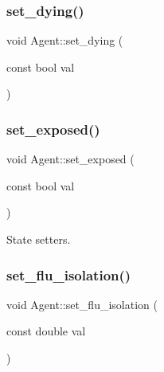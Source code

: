 \subsubsection{\texorpdfstring{set\+\_\+dying()}{set\_dying()}}
{\footnotesize\ttfamily void Agent\+::set\+\_\+dying (\begin{DoxyParamCaption}\item[{const bool}]{val }\end{DoxyParamCaption})\hspace{0.3cm}{\ttfamily [inline]}}

\mbox{\label{classAgent_a33c15434f6aa6e70eaf80044caa16376}} 
\subsubsection{\texorpdfstring{set\+\_\+exposed()}{set\_exposed()}}
{\footnotesize\ttfamily void Agent\+::set\+\_\+exposed (\begin{DoxyParamCaption}\item[{const bool}]{val }\end{DoxyParamCaption})\hspace{0.3cm}{\ttfamily [inline]}}



State setters. 

\mbox{\label{classAgent_ae66fd7d3371a11c2bb235cf761ceac26}} 
\subsubsection{\texorpdfstring{set\+\_\+flu\+\_\+isolation()}{set\_flu\_isolation()}}
{\footnotesize\ttfamily void Agent\+::set\+\_\+flu\+\_\+isolation (\begin{DoxyParamCaption}\item[{const double}]{val }\end{DoxyParamCaption})\hspace{0.3cm}{\ttfamily [inline]}}

\mbox{\label{classAgent_aee2da7db024cf43595e53431bd997b7b}} 
